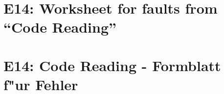 
\thispagestyle{empty}
\ifenglish
\section*{E14: Worksheet for faults from ``Code Reading''}

\fi
\ifgerman
\section*{E14: Code Reading - Formblatt f"ur Fehler}

\fi

